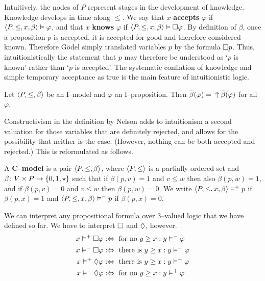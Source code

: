 Intuitively, the nodes of $P$ represent stages in the development
of knowledge. Knowledge develops in time along $\leq$. We say that
$x$ \textbf{accepts} $\varphi$ if $\langle P, \leq, x, \beta\rangle \vDash
\varphi$, and that $x$ \textbf{knows} $\varphi$ if $\langle P, \leq,
x, \beta\rangle \vDash \square \varphi$. By definition of $\beta$, once a
proposition $p$ is accepted, it is accepted for good and therefore
considered known. Therefore G\"odel simply translated variables $p$ 
by the formula $\square p$. Thus, intuitionistically the statement that 
$p$ may therefore be understood as `$p$ is known' rather than `$p$ 
is accepted'. The systematic conflation of knowledge and simple 
temporary acceptance as true is the main feature of intuitionistic 
logic.
\begin{prop}
Let $\langle P, \leq, \beta\rangle$ be an I--model and $\varphi$ an
I--pro\-po\-si\-tion. Then $\overline{\beta}(\varphi) =\; {\uparrow
\overline{\beta}(\varphi)}$ for all $\varphi$.
\end{prop}
Constructivism in the definition by Nelson adds to intuitionism
a second valuation for those variables that are definitely
rejected, and allows for the possibility that neither is the
case. (However, nothing can be both accepted and rejected.)
This is reformulated as follows.
\begin{defn}
A \textbf{C--model} is a pair $\langle P, \leq, \beta\rangle$, where
$\langle P, \leq\rangle$ is a partially ordered set and $\beta \colon V \times P
\rightarrow \{0,1,\star\}$ such that if $\beta(p,v) = 1$ and $v \leq w$
then also $\beta(p,w) = 1$, and if $\beta(p,v) = 0$ and $v  \leq w$
then $\beta(p,w) = 0$. We write $\langle P, \leq, x, \beta\rangle \vDash^+
p$ if $\beta(p,x) = 1$ and $\langle P, \leq, x, \beta\rangle \vDash^- p$
if $\beta(p,x) = 0$.
\end{defn}
We can interpret any propositional formula over 3--valued logic that
we have defined so far. We have to interpret $\square$ and $\lozenge$,
however.
\begin{equation}
\begin{split}
x \vDash^+ \square \varphi & :\Leftrightarrow \text{ for no }
    y \geq x: y\vDash^- \varphi \\
x \vDash^- \square \varphi & :\Leftrightarrow \text{ there is }
    y \geq x: y \vDash^- \varphi \\
x \vDash^+ \lozenge \varphi & :\Leftrightarrow \text{ there is }
    y \geq x: y\vDash^+ \varphi \\
x \vDash^- \lozenge \varphi & :\Leftrightarrow \text{ for no }
    y \geq x: y\vDash^+ \varphi
\end{split}
\end{equation}
